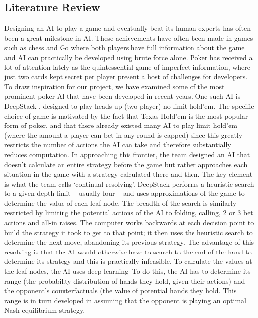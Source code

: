 \documentclass{article}
\begin{document}
\begin{multicols*}{2}
\section{Literature Review}

Designing an AI to play a game and eventually beat its human experts has often been a great milestone in AI. These achievements have often been made in games such as chess and Go where both players have full information about the game and AI can practically be developed using brute force alone. Poker has received a lot of attention lately as the quintessential game of imperfect information, where just two cards kept secret per player present a host of challenges for developers. To draw inspiration for our project, we have examined some of the most prominent poker AI that have been developed in recent years.
\newline
One such AI is DeepStack \cite{Deepstack}, designed to play heads up (two player) no-limit hold’em. The specific choice of game is motivated by the fact that Texas Hold’em is the most popular form of poker, and that there already existed many AI to play limit hold’em (where the amount a player can bet in any round is capped) since this greatly restricts the number of actions the AI can take and therefore substantially reduces computation. In approaching this frontier, the team designed an AI that doesn’t calculate an entire strategy before the game but rather approaches each situation in the game with a strategy calculated there and then. The key element is what the team calls ‘continual resolving’. DeepStack performs a heuristic search to a given depth limit – usually four – and uses approximations of the game to determine the value of each leaf node. The breadth of the search is similarly restricted by limiting the potential actions of the AI to folding, calling, 2 or 3 bet actions and all-in raises.
\newline
The computer works backwards at each decision point to build the strategy it took to get to that point; it then uses the heuristic search to determine the next move, abandoning its previous strategy. The advantage of this resolving is that the AI would otherwise have to search to the end of the hand to determine its strategy and this is practically infeasible. To calculate the values at the leaf nodes, the AI uses deep learning. To do this, the AI has to determine its range (the probability distribution of hands they hold, given their actions) and the opponent’s counterfactuals (the value of potential hands they hold. This range is in turn developed in assuming that the opponent is playing an optimal Nash equilibrium strategy.

\end{multicols*}
\end{document}
